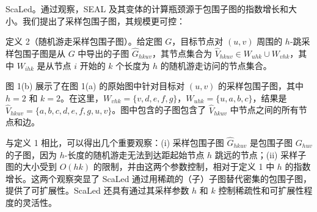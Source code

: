 \documentclass{article}
\begin{document}
ScaLed。通过观察，SEAL 及其变体的计算瓶颈源于包围子图的指数增长和大小。我们提出了采样包围子图，其规模更可控：

定义 2（随机游走采样包围子图）。给定图 $G$，目标节点对 $(u, v)$ 周围的 $h$-跳采样包围子图是从 $G$ 中导出的子图 $\hat{G}_{hkuv}$，其节点集合为 $\hat{V}_{hkuv} \in W_{uhk} \cup W_{vhk}$，其中 $W_{ihk}$ 是从节点 $i$ 开始的 $k$ 个长度为 $h$ 的随机游走访问的节点集合。

图 1(b) 展示了在图 1(a) 的原始图中针对目标对 $(u, v)$ 的采样包围子图，其中 $h = 2$ 和 $k = 2$。在这里，$W_{vhk} = \{v, d, e, f, g\}$，$W_{uhk} = \{u, a, b, c\}$，结果是 $\hat{V}_{hkuv} = \{a, b, c, d, e, f, g, u, v\}$。图中包含的子图包含了 $\hat{V}_{hkuv}$ 中节点之间的所有节点和边。

与定义 1 相比，可以得出几个重要观察：(i) 采样包围子图 $\hat{G}_{hkuv}$ 是包围子图 $G_{huv}$ 的子图，因为 $h$-长度的随机游走无法到达距起始节点 $h$ 跳远的节点；(ii) 采样子图的大小受到 $O(hk)$ 的限制，并由这两个参数控制，相对于定义 1 中 $h$ 的指数增长。这两个观察突显了 ScaLed 通过用稀疏的（子）子图替代密集的包围子图，提供了可扩展性。ScaLed 还具有通过其采样参数 $h$ 和 $k$ 控制稀疏性和可扩展性程度的灵活性。
\end{document}
